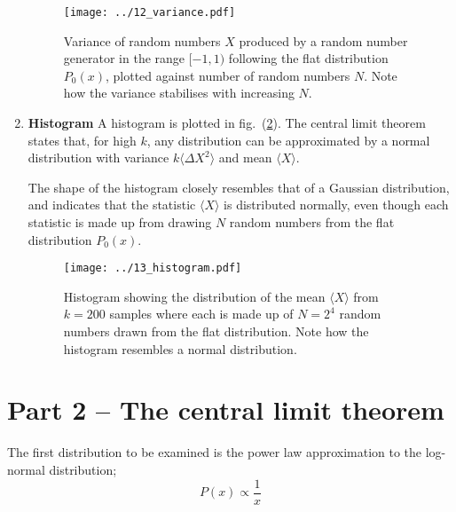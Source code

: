 \documentclass[a4paper,11pt]{article}
\begin{document}
\begin{enumerate}
        \begin{figure}[htb]
            \begin{center}
                \texttt{[image: ../12\_variance.pdf]}
            \end{center}
            \caption{Variance of random numbers $X$ produced by a random number generator in the range $[-1,1)$ following the flat distribution $P_0(x)$, plotted against number of random numbers $N$. Note how the variance stabilises with increasing $N$. }
            \label{fig:12_variance}
        \end{figure}

    \item \textbf{Histogram} A histogram  is plotted in fig.~(\ref{fig:13_histogram}). The central limit theorem states that, for high $k$, any distribution can be approximated by a normal distribution with variance $k \langle \Delta X^2 \rangle$ and mean $\langle X \rangle$.

        The shape of the histogram closely resembles that of a Gaussian distribution, and indicates that the statistic $\langle X \rangle$ is distributed normally, even though each statistic is made up from drawing $N$ random numbers from the flat distribution $P_0(x)$. 

        \begin{figure}[htb]
            \begin{center}
                \texttt{[image: ../13\_histogram.pdf]}
            \end{center}
            \caption{Histogram showing the distribution of the mean $\langle X \rangle$ from $k=200$ samples where each is made up of $N=2^{4}$ random numbers drawn from the flat distribution. Note how the histogram resembles a normal distribution.}
            \label{fig:13_histogram}
        \end{figure}
\end{enumerate}

\section{Part 2 -- The central limit theorem}
The first distribution to be examined is the power law approximation to the log-normal distribution;
\begin{equation}
    P(x) \propto \frac{1}{x}
    \label{eq:powerlawdist}
\end{equation}
\end{document}
